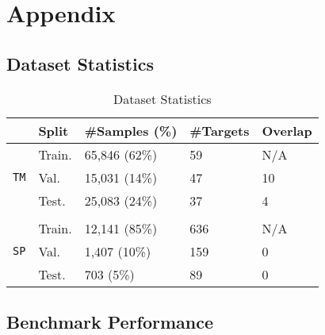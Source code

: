 \section{Appendix}

\subsection{Dataset Statistics}

\begin{table}[h]
    \centering
    \caption{Dataset Statistics}
    \label{tab:data}
    \begin{tabular}{lllll}
        \toprule
        & \textbf{Split} & \textbf{\#Samples} (\%) & \textbf{\#Targets} & \textbf{Overlap} \\
        \midrule
        \multirow{3}{*}{\texttt{TM}} 
        & Train. & 65,846 (62\%) & 59 & N/A \\
        & Val. & 15,031 (14\%) & 47 & 10 \\
        & Test. & 25,083 (24\%) & 37 & 4 \\
        \\
        \multirow{3}{*}{\texttt{SP}} 
        & Train. & 12,141 (85\%) & 636 & N/A \\
        & Val. & 1,407 (10\%) & 159 & 0 \\
        & Test. & 703 (5\%) & 89 & 0 \\
        \bottomrule
    \end{tabular}
\end{table}

\subsection{Benchmark Performance}

